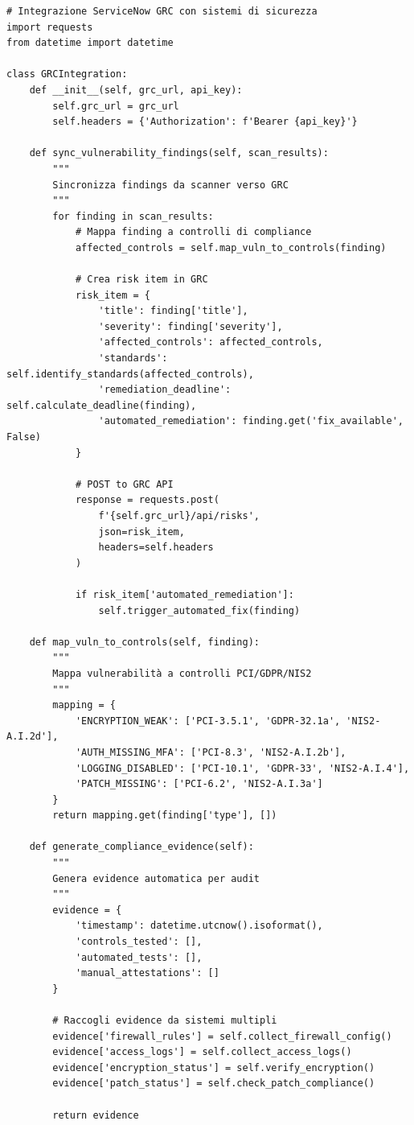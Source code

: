 \begin{lstlisting}[caption={Integrazione GRC via API},label={lst:grc_integration}]
# Integrazione ServiceNow GRC con sistemi di sicurezza
import requests
from datetime import datetime

class GRCIntegration:
    def __init__(self, grc_url, api_key):
        self.grc_url = grc_url
        self.headers = {'Authorization': f'Bearer {api_key}'}
    
    def sync_vulnerability_findings(self, scan_results):
        """
        Sincronizza findings da scanner verso GRC
        """
        for finding in scan_results:
            # Mappa finding a controlli di compliance
            affected_controls = self.map_vuln_to_controls(finding)
            
            # Crea risk item in GRC
            risk_item = {
                'title': finding['title'],
                'severity': finding['severity'],
                'affected_controls': affected_controls,
                'standards': self.identify_standards(affected_controls),
                'remediation_deadline': self.calculate_deadline(finding),
                'automated_remediation': finding.get('fix_available', False)
            }
            
            # POST to GRC API
            response = requests.post(
                f'{self.grc_url}/api/risks',
                json=risk_item,
                headers=self.headers
            )
            
            if risk_item['automated_remediation']:
                self.trigger_automated_fix(finding)
    
    def map_vuln_to_controls(self, finding):
        """
        Mappa vulnerabilità a controlli PCI/GDPR/NIS2
        """
        mapping = {
            'ENCRYPTION_WEAK': ['PCI-3.5.1', 'GDPR-32.1a', 'NIS2-A.I.2d'],
            'AUTH_MISSING_MFA': ['PCI-8.3', 'NIS2-A.I.2b'],
            'LOGGING_DISABLED': ['PCI-10.1', 'GDPR-33', 'NIS2-A.I.4'],
            'PATCH_MISSING': ['PCI-6.2', 'NIS2-A.I.3a']
        }
        return mapping.get(finding['type'], [])
    
    def generate_compliance_evidence(self):
        """
        Genera evidence automatica per audit
        """
        evidence = {
            'timestamp': datetime.utcnow().isoformat(),
            'controls_tested': [],
            'automated_tests': [],
            'manual_attestations': []
        }
        
        # Raccogli evidence da sistemi multipli
        evidence['firewall_rules'] = self.collect_firewall_config()
        evidence['access_logs'] = self.collect_access_logs()
        evidence['encryption_status'] = self.verify_encryption()
        evidence['patch_status'] = self.check_patch_compliance()
        
        return evidence
\end{lstlisting}

